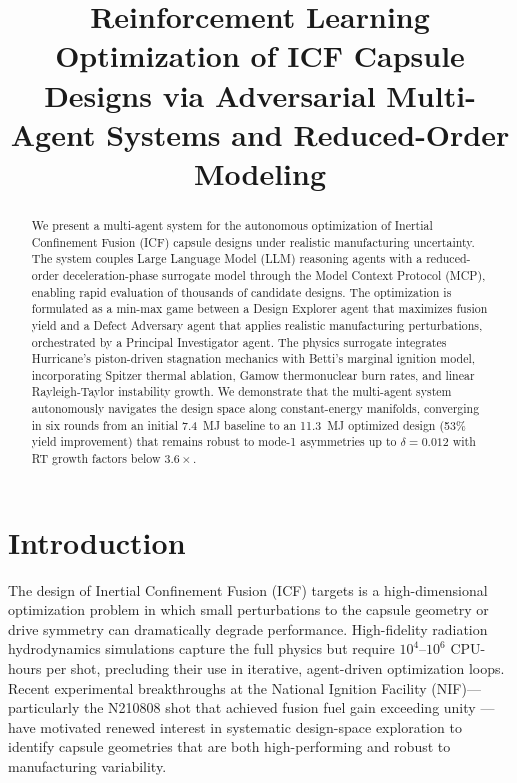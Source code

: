 \documentclass[conference]{IEEEtran}
\begin{document}
\title{Reinforcement Learning Optimization of ICF Capsule Designs via Adversarial Multi-Agent Systems and Reduced-Order Modeling}

\author{
}

\maketitle

\begin{abstract}
We present a multi-agent system for the autonomous optimization of Inertial Confinement Fusion (ICF) capsule designs under realistic manufacturing uncertainty.  The system couples Large Language Model (LLM) reasoning agents with a reduced-order deceleration-phase surrogate model through the Model Context Protocol (MCP), enabling rapid evaluation of thousands of candidate designs.  The optimization is formulated as a min-max game between a Design Explorer agent that maximizes fusion yield and a Defect Adversary agent that applies realistic manufacturing perturbations, orchestrated by a Principal Investigator agent.  The physics surrogate integrates Hurricane's piston-driven stagnation mechanics with Betti's marginal ignition model, incorporating Spitzer thermal ablation, Gamow thermonuclear burn rates, and linear Rayleigh-Taylor instability growth.  We demonstrate that the multi-agent system autonomously navigates the design space along constant-energy manifolds, converging in six rounds from an initial 7.4~MJ baseline to an 11.3~MJ optimized design (53\% yield improvement) that remains robust to mode-1 asymmetries up to $\delta = 0.012$ with RT growth factors below $3.6\times$.
\end{abstract}

\section{Introduction}

The design of Inertial Confinement Fusion (ICF) targets is a high-dimensional optimization problem in which small perturbations to the capsule geometry or drive symmetry can dramatically degrade performance.  High-fidelity radiation hydrodynamics simulations capture the full physics but require $10^4$--$10^6$ CPU-hours per shot, precluding their use in iterative, agent-driven optimization loops.  Recent experimental breakthroughs at the National Ignition Facility (NIF)---particularly the N210808 shot that achieved fusion fuel gain exceeding unity \cite{hurricane2014, abu-shawareb2024}---have motivated renewed interest in systematic design-space exploration to identify capsule geometries that are both high-performing and robust to manufacturing variability.
\end{document}
